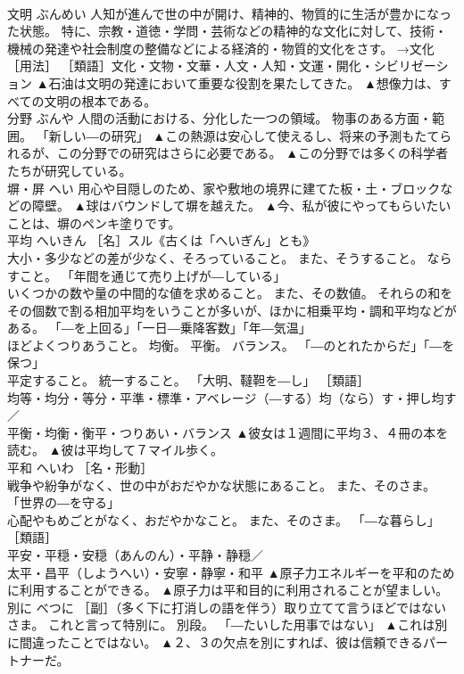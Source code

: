 \documentclass[8pt]{extreport}
\begin{document}
\begin{CJK}{UTF8}{min}
\\	文明	ぶんめい	人知が進んで世の中が開け、精神的、物質的に生活が豊かになった状態。 特に、宗教・道徳・学問・芸術などの精神的な文化に対して、技術・機械の発達や社会制度の整備などによる経済的・物質的文化をさす。 →文化［用法］ ［類語］文化・文物・文華・人文・人知・文運・開化・シビリゼーション	▲石油は文明の発達において重要な役割を果たしてきた。 ▲想像力は、すべての文明の根本である。
\\	分野	ぶんや	人間の活動における、分化した一つの領域。 物事のある方面・範囲。 「新しい―の研究」	▲この熱源は安心して使えるし、将来の予測もたてられるが、この分野での研究はさらに必要である。 ▲この分野では多くの科学者たちが研究している。
\\	塀・屏	へい	用心や目隠しのため、家や敷地の境界に建てた板・土・ブロックなどの障壁。	▲球はバウンドして塀を越えた。 ▲今、私が彼にやってもらいたいことは、塀のペンキ塗りです。
\\	平均	へいきん	［名］スル《古くは「へいぎん」とも》 
\\	大小・多少などの差が少なく、そろっていること。 また、そうすること。 ならすこと。 「年間を通じて売り上げが―している」 
\\	いくつかの数や量の中間的な値を求めること。 また、その数値。 それらの和をその個数で割る相加平均をいうことが多いが、ほかに相乗平均・調和平均などがある。 「―を上回る」「一日―乗降客数」「年―気温」 
\\	ほどよくつりあうこと。 均衡。 平衡。 バランス。 「―のとれたからだ」「―を保つ」 
\\	平定すること。 統一すること。 「大明、韃靼を―し」 ［類語］
\\	均等・均分・等分・平準・標準・アベレージ（―する）均（なら）す・押し均す／
\\	平衡・均衡・衡平・つりあい・バランス	▲彼女は１週間に平均３、４冊の本を読む。 ▲彼は平均して７マイル歩く。
\\	平和	へいわ	［名・形動］ 
\\	戦争や紛争がなく、世の中がおだやかな状態にあること。 また、そのさま。 「世界の―を守る」 
\\	心配やもめごとがなく、おだやかなこと。 また、そのさま。 「―な暮らし」 ［類語］
\\	平安・平穏・安穏（あんのん）・平静・静穏／
\\	太平・昌平（しようへい）・安寧・静寧・和平	▲原子力エネルギーを平和のために利用することができる。 ▲原子力は平和目的に利用されることが望ましい。
\\	別に	べつに	［副］（多く下に打消しの語を伴う）取り立てて言うほどではないさま。 これと言って特別に。 別段。 「―たいした用事ではない」	▲これは別に間違ったことではない。 ▲２、３の欠点を別にすれば、彼は信頼できるパートナーだ。

\end{CJK}
\end{document}
